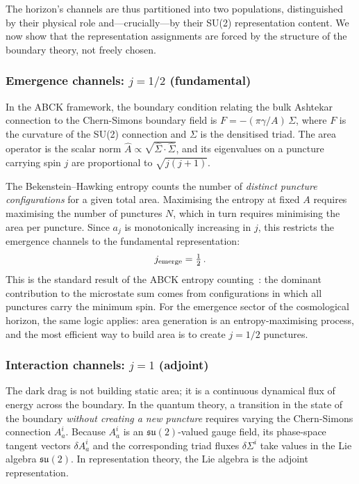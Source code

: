 \documentclass[aps,prd,twocolumn,10pt,superscriptaddress,nofootinbib]{revtex4-2}
\begin{document}
The horizon's channels are thus partitioned into two populations,
distinguished by their physical role and---crucially---by their
SU(2) representation content.  We now show that the representation
assignments are forced by the structure of the boundary theory,
not freely chosen.


\subsubsection{Emergence channels: \texorpdfstring{$j = 1/2$}{j = 1/2} (fundamental)}
\label{sec:emergence_channels}

In the ABCK framework, the boundary condition relating the bulk
Ashtekar connection to the Chern-Simons boundary field is
$F = -(\pi\gamma/A)\,\Sigma$, where $F$ is the curvature of the
SU(2) connection and $\Sigma$ is the densitised triad.  The area
operator is the scalar norm
$\hat{A} \propto \sqrt{\hat{\Sigma}\cdot\hat{\Sigma}}$, and its
eigenvalues on a puncture carrying spin $j$ are proportional to
$\sqrt{j(j+1)}$.

The Bekenstein--Hawking entropy counts the number of
\emph{distinct puncture configurations} for a given total area.
Maximising the entropy at fixed $A$ requires maximising the number
of punctures $N$, which in turn requires minimising the area per
puncture.  Since $a_j$ is monotonically increasing in $j$, this
restricts the emergence channels to the fundamental
representation:
\begin{equation}
j_{\rm emerge} = \tfrac{1}{2}\,.
\label{eq:j_emerge}
\end{equation}
This is the standard result of the ABCK entropy
counting~\cite{Ashtekar1998,Ashtekar2000,Ghosh2011}: the dominant
contribution to the microstate sum comes from configurations
in which all punctures carry the minimum spin.  For the emergence
sector of the cosmological horizon, the same logic applies: area
generation is an entropy-maximising process, and the most efficient
way to build area is to create $j = 1/2$ punctures.


\subsubsection{Interaction channels: \texorpdfstring{$j = 1$}{j = 1} (adjoint)}
\label{sec:interaction_channels}

The dark drag is not building static area; it is a continuous
dynamical flux of energy across the boundary.  In the quantum
theory, a transition in the state of the boundary \emph{without
creating a new puncture} requires varying the Chern-Simons
connection $A_a^i$.  Because $A_a^i$ is an
$\mathfrak{su}(2)$-valued gauge field, its phase-space tangent
vectors $\delta A_a^i$ and the corresponding triad fluxes
$\delta\Sigma^i$ take values in the Lie algebra
$\mathfrak{su}(2)$.  In representation theory, the Lie algebra
is the adjoint representation.
\end{document}
